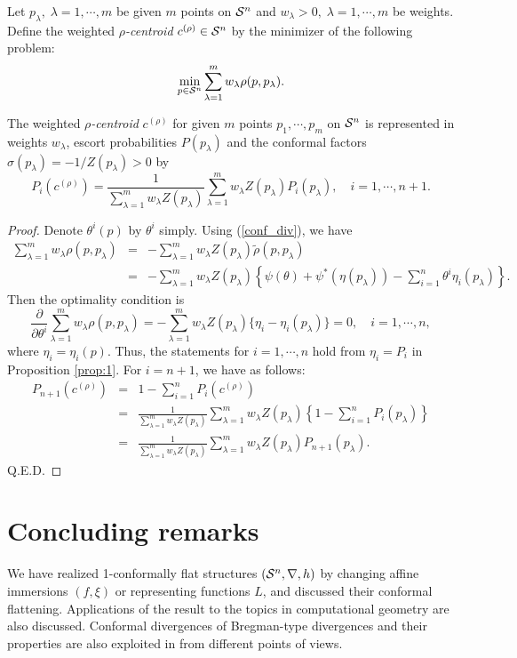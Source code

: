 \documentclass{llncs}
\begin{document}
Let $p_\lambda, \; \lambda=1, \cdots, m$ be given $m$ points 
on ${\cal S}^n$ and $w_\lambda > 0, \; \lambda=1, \cdots, m$ be weights.
Define the weighted {\em $\rho$-centroid} $c^{(\rho)} \in {\cal S}^n$ by 
the minimizer of the following problem:
\[
	\min_{p \in {\cal S}^n} 
		\sum_{\lambda=1}^m w_\lambda \rho(p,p_\lambda).
\]
\begin{theorem}
The weighted {\em $\rho$-centroid} $c^{(\rho)}$ for given $m$ points 
$p_1, \cdots, p_m$ on ${\cal S}^n$ is represented 
in weights $w_\lambda$, escort probabilities $P(p_\lambda)$ and 
the conformal factors $\sigma(p_\lambda)=-1/Z(p_\lambda)>0$ by 
\[
	P_i(c^{(\rho)})= \frac{1}{\sum_{\lambda=1}^m w_\lambda Z(p_\lambda)} 
		\sum_{\lambda=1}^m w_\lambda Z(p_\lambda) P_i(p_\lambda), 
		\quad i=1,\cdots,n+1.
\]
\end{theorem}
\begin{proof}
Denote $\theta^i(p)$ by $\theta^i$ simply. Using (\ref{conf_div}), 
we have
\begin{eqnarray*}
	\sum_{\lambda=1}^m w_\lambda \rho(p,p_\lambda)
	&=&-\sum_{\lambda=1}^m w_\lambda Z(p_\lambda)
		\tilde \rho(p,p_\lambda) \\
	&=&-\sum_{\lambda=1}^m w_\lambda Z(p_\lambda)\left\{\psi(\theta)
	+\psi^*(\eta(p_\lambda))
	-\sum_{i=1}^n \theta^i \eta_i(p_\lambda)\right\}.
\end{eqnarray*}
Then the optimality condition is 
\[
	\frac{\partial}{\partial \theta^i} 
	\sum_{\lambda=1}^m w_\lambda \rho(p,p_\lambda)
	= -\sum_{\lambda=1}^m w_\lambda Z(p_\lambda)
	\{\eta_i-\eta_i(p_\lambda)\}=0, 
	\quad i=1,\cdots, n,
\]
where $\eta_i=\eta_i(p)$.
Thus, the statements for $i=1,\cdots,n$ hold from $\eta_i=P_i$ in 
Proposition \ref{prop:1}.
For $i=n+1$, we have as follows:
\begin{eqnarray*}
	P_{n+1}(c^{(\rho)})&=&1-\sum_{i=1}^n P_i(c^{(\rho)}) \\
	&=&\frac{1}{\sum_{\lambda=1}^m w_\lambda Z(p_\lambda)} 
		\sum_{\lambda=1}^m w_\lambda Z(p_\lambda) 
		\left\{1-\sum_{i=1}^n P_i(p_\lambda) \right\}\\
	&=&\frac{1}{\sum_{\lambda=1}^m w_\lambda Z(p_\lambda)} 
		\sum_{\lambda=1}^m w_\lambda Z(p_\lambda) P_{n+1}(p_\lambda).
\end{eqnarray*}
\hfill Q.E.D.
\end{proof}

\section{Concluding remarks}
We have realized 1-conformally flat structures $({\cal S}^n,\nabla,h)$ by 
changing affine immersions $(f,\xi)$ or representing functions $L$, 
and discussed their conformal flattening.
Applications of the result to the topics in computational geometry 
are also discussed.
Conformal divergences of Bregman-type divergences and their properties 
are also exploited in \cite{NNA16} from different points of views.
\end{document}
